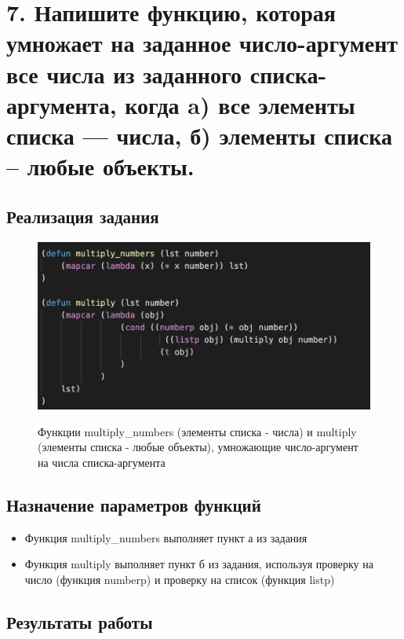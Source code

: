 \documentclass[a4paper,12pt]{article}
\begin{document}
	\newpage
	
	\section*{7. Напишите функцию, которая умножает на заданное число-аргумент все числа
из заданного списка-аргумента, когда
a) все элементы списка --- числа,
б) элементы списка -- любые объекты.
	}
	
	\subsection*{Реализация задания}
	
	\begin{figure}[h!]
		\begin{center}
			{\includegraphics[scale = 1.0]{7.png}}
			\label{ris:7}
		\end{center}
	\caption{Функции multiply\_numbers (элементы списка - числа) и multiply (элементы списка - любые объекты), умножающие число-аргумент на числа списка-аргумента}
	\end{figure}
	
	\subsection*{Назначение параметров функций}
	
	\begin{itemize}
		\item Функция multiply\_numbers выполняет пункт а из задания
		\item Функция multiply выполняет пункт б из задания, используя проверку на число (функция numberp) и проверку на список (функция listp)
	\end{itemize}
	
	\subsection*{Результаты работы}
	
\end{document}
